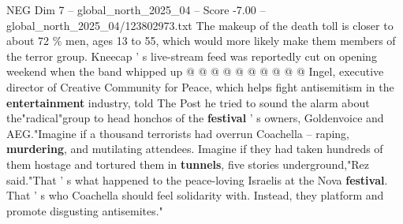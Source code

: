 \begin{textsample}{NEG Dim 7 – global\_north\_2025\_04 – Score -7.00 – global\_north\_2025\_04/123802973.txt}
The makeup of the death toll is closer to about 72 \% men, ages 13 to 55, which would more likely make them members of the terror group.
Kneecap ' s live-stream feed was reportedly cut on opening weekend when the band whipped up @ @ @ @ @ @ @ @ @ @ Ingel, executive director of Creative Community for Peace, which helps fight antisemitism in the \textbf{entertainment} industry, told The Post he tried to sound the alarm about the"radical"group to head honchos of the \textbf{festival} ' s owners, Goldenvoice and AEG."Imagine if a thousand terrorists had overrun Coachella -- raping, \textbf{murdering}, and mutilating attendees.
Imagine if they had taken hundreds of them hostage and tortured them in \textbf{tunnels}, five stories underground,"Rez said."That ' s what happened to the peace-loving Israelis at the Nova \textbf{festival}.
That ' s who Coachella should feel solidarity with.
Instead, they platform and promote disgusting antisemites."

\end{textsample}
